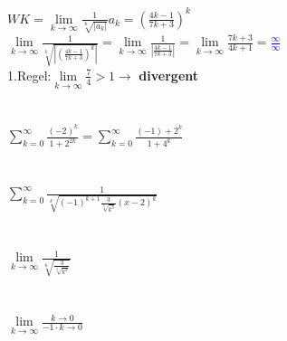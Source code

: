 \documentclass[12pt,a4paper]{article}
\begin{document}
\newpage
$WK=\lim\limits_{k\rightarrow\infty}\frac{1}{\sqrt[k]{|a_k|}} a_k=(\frac{4k-1}{7k+3})^k$\\
$\lim\limits_{k\rightarrow\infty}\frac{1}{\sqrt[k]{|(\frac{4k-1}{7k+3})^k|}} = \lim\limits_{k\rightarrow\infty}\frac{1}{|\frac{4k-1}{7k+3}|} = \lim\limits_{k\rightarrow\infty}\frac{7k+3}{4k+1}=$\textcolor{blue}{$\frac{\infty}{\infty}$}\\
1.Regel:$\lim\limits_{k\rightarrow\infty}\frac{7}{4} > 1 \rightarrow$ \textbf{divergent}\\
\\
\\
$\sum\limits_{k=0}^{\infty}\frac{(-2)^k}{1+2^{2k}}=\sum\limits_{k=0}^{\infty}\frac{(-1)+2^k}{1+4^k}$\\
\\
\\
$\sum\limits_{k=0}^{\infty}\frac{1}{\sqrt[k]{(-1)^{k+1}\frac{3}{\sqrt[5]{k^3}}(x-2)^k}}$\\
\\
\\
$\lim\limits_{k\rightarrow\infty}\frac{1}{\sqrt[k]{\frac{3}{\sqrt[5]{k^3}}}}$\\
\\
\\
$\lim\limits_{k\rightarrow\infty}\frac{k\rightarrow 0}{-1 \cdot k\rightarrow 0}$\\
\end{document}
